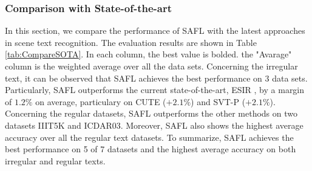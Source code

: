 \subsubsection{Comparison with State-of-the-art}
In this section, we compare the performance of SAFL with the latest approaches in scene text recognition. 
The evaluation results are shown in Table \ref{tab:CompareSOTA}.
In each column, the best value is bolded. 
the "Avarage" column is the weighted average over all the data sets. 
Concerning the irregular text, it can be observed that SAFL achieves the best performance on $3$ data sets. 
Particularly, SAFL outperforms the current state-of-the-art, ESIR \cite{zhan2019esir}, by a margin of $1.2 \%$ on average, particulary on CUTE ($+2.1\%$) and SVT-P ($+2.1\%$).
Concerning the regular datasets, SAFL outperforms the other methods on two datasets IIIT5K and ICDAR03. Moreover, SAFL also shows the highest average accuracy over all the regular text datasets. To summarize, SAFL achieves the best performance on 5 of 7 datasets and the highest average accuracy on both irregular and regular texts. 
